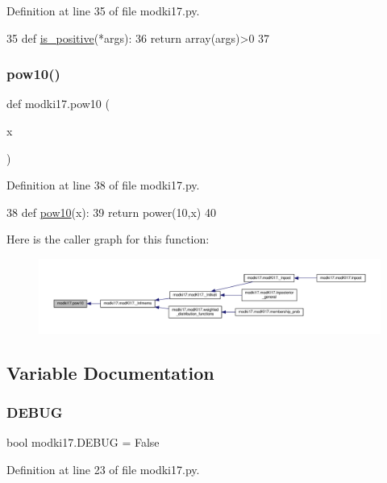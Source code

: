Definition at line 35 of file modki17.\+py.


\begin{DoxyCode}
35 \textcolor{keyword}{def }\hyperlink{namespacemodki17_a12f4b9926b321d64b51a76533be122e2}{is\_positive}(*args):
36     \textcolor{keywordflow}{return} array(args)>0
37 
\end{DoxyCode}
\mbox{\label{namespacemodki17_ada83ead5e6085ed227b1e64d233eea03}} 
\subsubsection{\texorpdfstring{pow10()}{pow10()}}
{\footnotesize\ttfamily def modki17.\+pow10 (\begin{DoxyParamCaption}\item[{}]{x }\end{DoxyParamCaption})}



Definition at line 38 of file modki17.\+py.


\begin{DoxyCode}
38 \textcolor{keyword}{def }\hyperlink{namespacemodki17_ada83ead5e6085ed227b1e64d233eea03}{pow10}(x):
39     \textcolor{keywordflow}{return} power(10,x)
40 
\end{DoxyCode}
Here is the caller graph for this function\+:\nopagebreak
\begin{figure}[H]
\begin{center}
\leavevmode
\includegraphics[width=350pt]{db/d4d/namespacemodki17_ada83ead5e6085ed227b1e64d233eea03_icgraph}
\end{center}
\end{figure}


\subsection{Variable Documentation}
\mbox{\label{namespacemodki17_a86807df4fe7d08c11ff4266c9e5dd9ac}} 
\subsubsection{\texorpdfstring{D\+E\+B\+UG}{DEBUG}}
{\footnotesize\ttfamily bool modki17.\+D\+E\+B\+UG = False}



Definition at line 23 of file modki17.\+py.

